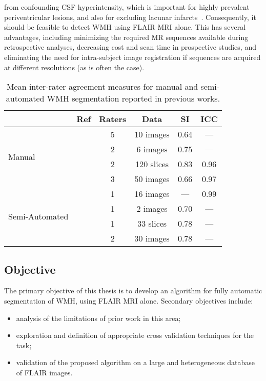 from confounding CSF hyperintensity, which is important
for highly prevalent periventricular lesions,
and also for excluding lacunar infarcts~\cite{Bakshi2001,Barkhof2002}.
Consequently, it should be feasible to detect WMH using FLAIR MRI alone.
This has several advantages, including
minimizing the required MR sequences available during retrospective analyses,
decreasing cost and scan time in prospective studies,
and eliminating the need for intra-subject image registration if
sequences are acquired at different resolutions (as is often the case).
\par
\begin{table}[ht]
  \caption{Mean inter-rater agreement measures
    for manual and semi-automated WMH segmentation reported in previous works.}%
  \label{tab:interrater-cite}
  \centering
  \begin{tabular}{lccccc}
  	\toprule
  	                                &          Ref       & Raters &    Data    &  SI  & ICC  \\ \midrule
  	\multirow{4}{*}{Manual}         &\cite{Harmouche2006}&   5    & 10 images  & 0.64 & ---  \\
  	                                &\cite{DeBoer2009b}  &   2    &  6 images  & 0.75 & ---  \\
  	                                &\cite{Steenwijk2013}&   2    & 120 slices & 0.83 & 0.96 \\
  	                                &\cite{Egger2017}    &   3    & 50 images  & 0.66 & 0.97 \\ \midrule
  	\multirow{4}{*}{Semi-Automated} &\cite{Payne2002}    &   1    & 16 images  & ---  & 0.99 \\
  	                                &\cite{Ghazel2006}   &   1    &  2 images  & 0.70 & ---  \\
  	                                &\cite{Kawata2010}   &   1    & 33 slices  & 0.78 & ---  \\
  	                                &\cite{Iorio2013}    &   2    & 30 images  & 0.78 & ---  \\ \bottomrule
  \end{tabular}
\end{table}
\subsection{Objective}
The primary objective of this thesis is to develop an algorithm
for fully automatic segmentation of WMH, using FLAIR MRI alone.
Secondary objectives include:
\begin{itemize}
  \item analysis of the limitations of prior work in this area;
  \item exploration and definition of appropriate cross validation techniques for the task;
  \item validation of the proposed algorithm on a large and heterogeneous database of FLAIR images.
\end{itemize}
